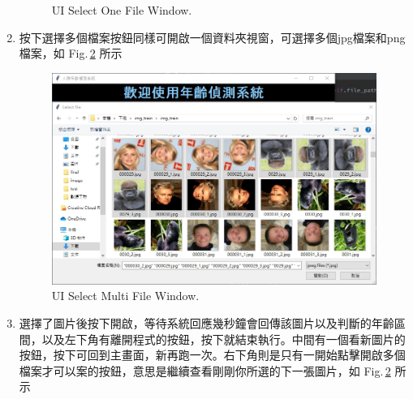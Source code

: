 \documentclass{scrreprt}
\begin{document}
\begin{CJK}{UTF8}{bkai}
\begin{enumerate}
\begin{figure}[htb]
\begin{center}
        \end{center}
        \caption{UI Select One File Window.}
        \label{fig:2}
    \end{figure}
    \vspace{7.0cm}
    \item 按下選擇多個檔案按鈕同樣可開啟一個資料夾視窗，可選擇多個jpg檔案和png檔案，如 Fig.\,\ref{fig:3} 所示\\
    \begin{figure}[htb]
        \begin{center}
            \includegraphics[scale=0.6]{image/UiSelectFileMulti.png}%
        \end{center}
        \caption{UI Select Multi File Window.}
        \label{fig:3}
    \end{figure}
    \vspace{7.0cm}
    \item 選擇了圖片後按下開啟，等待系統回應幾秒鐘會回傳該圖片以及判斷的年齡區間，以及左下角有離開程式的按鈕，按下就結束執行。中間有一個看新圖片的按鈕，按下可回到主畫面，新再跑一次。右下角則是只有一開始點擊開啟多個檔案才可以案的按鈕，意思是繼續查看剛剛你所選的下一張圖片，如 Fig.\,\ref{fig:3} 所示\\
    \begin{figure}[htb]
        \begin{center}

\end{center}
\end{figure}
\end{enumerate}
\end{CJK}
\end{document}
